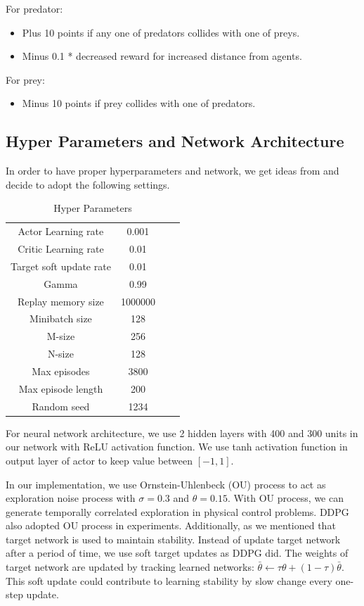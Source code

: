 \documentclass[11pt,twocolumn]{jarticle} %
\begin{document}
For predator:
\begin{itemize}
  \item Plus 10 points if any one of predators collides with one of preys.
  \item Minus 0.1 * decreased reward for increased distance from agents.
\end{itemize}
For prey:
\begin{itemize}
  \item Minus 10 points if prey collides with one of predators.
\end{itemize}

\subsection{Hyper Parameters and Network Architecture}
In order to have proper hyperparameters and network, we get ideas from\cite{param} and decide to adopt the following settings.

\begin{table}[ht]
 \caption{Hyper Parameters} 
 \label{tbl:hyperparameters}
  \begin{center}
    \begin{tabular}{c|ccc}
  \hline \hline
  Actor Learning rate  & 0.001   \\
  Critic Learning rate & 0.01    \\
  Target soft update rate & 0.01 \\
  Gamma                & 0.99    \\
  Replay memory size   & 1000000 \\
  Minibatch size       & 128     \\
  M-size               & 256     \\
  N-size               & 128     \\
  Max episodes         & 3800   \\
  Max episode length   & 200     \\
  Random seed          & 1234    \\\hline
    \end{tabular}
  \end{center}
\end{table}

For neural network architecture, we use 2 hidden layers with 400 and 300 units in our network with ReLU activation function. We use tanh activation function in output layer of actor to keep value between $[-1, 1]$. 

In our implementation, we use Ornstein-Uhlenbeck (OU) process\cite{ou} to act as exploration noise process with $\sigma = 0.3$ and $\theta = 0.15$. With OU process, we can generate temporally correlated exploration in physical control problems. DDPG\cite{ddpg} also adopted OU process in experiments. Additionally, as we mentioned that target network is used to maintain stability. Instead of update target network after a period of time, we use soft target updates as DDPG did. The weights of target network are updated by tracking learned networks: $\bar{\theta} \leftarrow \tau \theta + (1 - \tau)\bar{\theta}$. This soft update could contribute to learning stability by slow change every one-step update. \par
\end{document}
